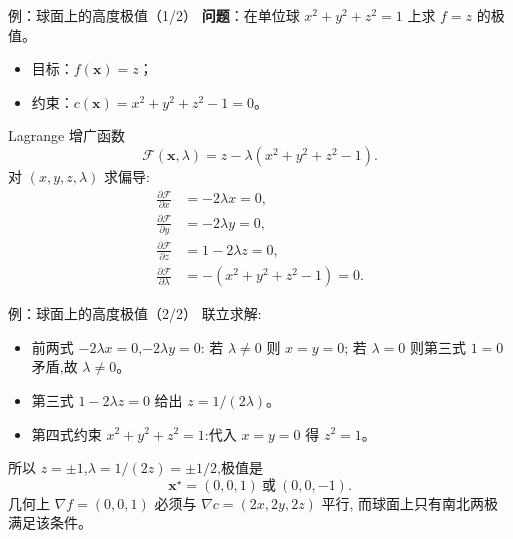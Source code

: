 \documentclass[fontset=windows, chinese, 10pt, xcolor=dvipsnames]{beamer}
\begin{document}
\begin{frame}{例：球面上的高度极值（1/2）}
  \textbf{问题}：在单位球 $x^2+y^2+z^2=1$ 上求 $f=z$ 的极值。
  \begin{itemize}
    \item 目标：$f(\mathbf{x})=z$；
    \item 约束：$c(\mathbf{x})=x^2+y^2+z^2-1=0$。
  \end{itemize}
  Lagrange 增广函数
  \begin{equation*}
    \mathcal{F}(\mathbf{x},\lambda)=z-\lambda(x^2+y^2+z^2-1).
  \end{equation*}
  对 $(x,y,z,\lambda)$ 求偏导:
  \begin{align*}
    \frac{\partial\mathcal{F}}{\partial x}&=-2\lambda x=0,\\
    \frac{\partial\mathcal{F}}{\partial y}&=-2\lambda y=0,\\
    \frac{\partial\mathcal{F}}{\partial z}&=1-2\lambda z=0,\\
    \frac{\partial\mathcal{F}}{\partial\lambda}&=-(x^2+y^2+z^2-1)=0.
  \end{align*}
\end{frame}

\begin{frame}{例：球面上的高度极值（2/2）}
  联立求解:
  \begin{itemize}
    \item 前两式 $-2\lambda x=0$,$-2\lambda y=0$:
      若 $\lambda\neq 0$ 则 $x=y=0$;
      若 $\lambda=0$ 则第三式 $1=0$ 矛盾,故 $\lambda\neq 0$。
    \item 第三式 $1-2\lambda z=0$ 给出 $z=1/(2\lambda)$。
    \item 第四式约束 $x^2+y^2+z^2=1$:代入 $x=y=0$ 得 $z^2=1$。
  \end{itemize}
  所以 $z=\pm 1$,$\lambda=1/(2z)=\pm 1/2$,极值是
  \begin{equation*}
    \boxed{\mathbf{x}^\star=(0,0,1)\ \text{或}\ (0,0,-1).}
  \end{equation*}
  几何上 $\nabla f=(0,0,1)$ 必须与 $\nabla c=(2x,2y,2z)$ 平行,
  而球面上只有南北两极满足该条件。
\end{frame}
\end{document}
